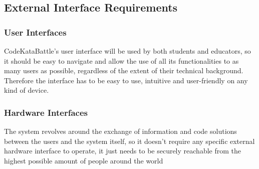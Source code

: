 \documentclass[../RASD.tex]{subfiles}
\begin{document}


    \setcounter{rown}{1}

    \newcommand{\rowIndex}{\arabic{rown}\stepcounter{rown}}
    \subsection{External Interface Requirements}

        \subsubsection{User Interfaces}
            CodeKataBattle's user interface will be used by both students and educators, so it should be easy to navigate and allow the use of all its functionalities to as many users as possible, regardless of the extent of their technical background. Therefore the interface has to be easy to use, intuitive and user-friendly on any kind of device.

        \subsubsection{Hardware Interfaces}
            The system revolves around the exchange of information and code solutions between the users and the system itself, so it doesn't require any specific external hardware interface to operate, it just needs to be securely reachable from the highest possible amount of people around the world
      
\end{document}
